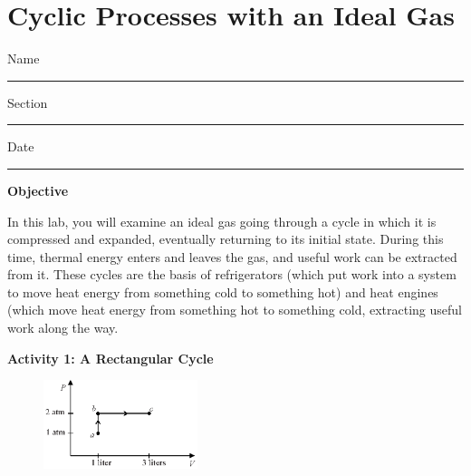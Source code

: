 \section{Cyclic Processes with an Ideal Gas}

Name \rule{2.0in}{0.1pt}\hfill{}Section \rule{1.0in}{0.1pt}\hfill{}Date
\rule{1.0in}{0.1pt}

\vspace{0.1in}
\textbf{Objective} 

In this lab, you will examine an ideal gas going through a cycle in which it is compressed and expanded, eventually returning to its initial state.  During this time, thermal energy enters and leaves the gas, and useful work can be extracted from it.  These cycles are the basis of refrigerators (which put work into a system to move heat energy from something cold to something hot) and heat engines (which move heat energy from something hot to something cold, extracting useful work along the way.

\textbf{Activity 1: A Rectangular Cycle}

\begin{figure}
    \vspace{-0.2 in}
    \includegraphics[width=0.4\textwidth]{ideal_gas_cycles/square_cycle1.eps}
\end{figure}

